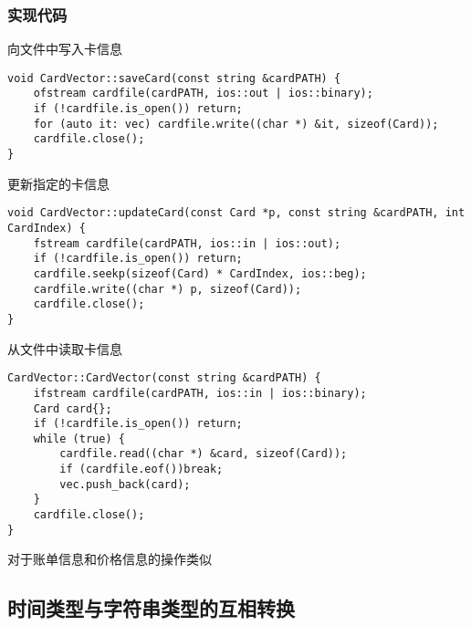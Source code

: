 \documentclass[UTF8]{ctexart}
\begin{document}
	\subsubsection{实现代码}
	\qquad 向文件中写入卡信息 \\
	\begin{lstlisting}
void CardVector::saveCard(const string &cardPATH) {
	ofstream cardfile(cardPATH, ios::out | ios::binary);
	if (!cardfile.is_open()) return;
	for (auto it: vec) cardfile.write((char *) &it, sizeof(Card));
	cardfile.close();
}
	\end{lstlisting}
	\qquad 更新指定的卡信息 \\
	\begin{lstlisting}
void CardVector::updateCard(const Card *p, const string &cardPATH, int CardIndex) {
	fstream cardfile(cardPATH, ios::in | ios::out);
	if (!cardfile.is_open()) return;
	cardfile.seekp(sizeof(Card) * CardIndex, ios::beg);
	cardfile.write((char *) p, sizeof(Card));
	cardfile.close();
}
	\end{lstlisting}
	\qquad 从文件中读取卡信息 \\
	\begin{lstlisting}
CardVector::CardVector(const string &cardPATH) {
	ifstream cardfile(cardPATH, ios::in | ios::binary);
	Card card{};
	if (!cardfile.is_open()) return;
	while (true) {
		cardfile.read((char *) &card, sizeof(Card));
		if (cardfile.eof())break;
		vec.push_back(card);
	}
	cardfile.close();
}
	\end{lstlisting}
	\qquad 对于账单信息和价格信息的操作类似
	
	\subsection{时间类型与字符串类型的互相转换}
\end{document}
